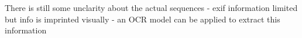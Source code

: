 There is still some unclarity about the actual sequences - exif information limited but info is imprinted visually - an OCR model can be applied to extract this information







